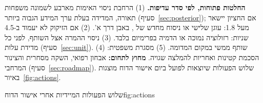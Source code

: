 \textbf{החלטות פתוחות, לפי סדר עדיפות.} (\num{1}) הרחבת ניסוי האימות מארבע לשמונה משפחות תאורה, המדידה בעלת ערך המידע הגבוה ביותר (סעיף~\ref{sec:posterior}); אם החציון יישאר מעל \num{1.8}: עוגן שלישי או ניסוח מחדש של , באבן דרך א'. (\num{2}) אם הזיקוק לא יעמוד ב-\num{4.5} שניות: רזולוציה נמוכה או הדמיה בפרימיום בלבד. (\num{3}) ניסוי ההמרה אצל השותף, לפני כל מדידת עלות (סעיף~\ref{sec:unit}). (\num{4}) שותף ממשי במקום המדומה. (\num{5}) מסגרת משפטית: הסכמת קטינות ואחריות להמלצה שגויה. \textbf{מחוץ לתחום:} אבחון רפואי, השקה מסחרית והצינור המרחבי (סעיף~\ref{sec:roadmap}). שלוש הפעולות שיוצאות לפועל ביום אישור הדוח מוצגות באיור~\ref{fig:actions}.

{\renewcommand{\needspace}[1]{}%
\begin{reportfigure*}{שלוש הפעולות המיידיות אחרי אישור הדוח}{fig:actions}
\end{reportfigure*}}

